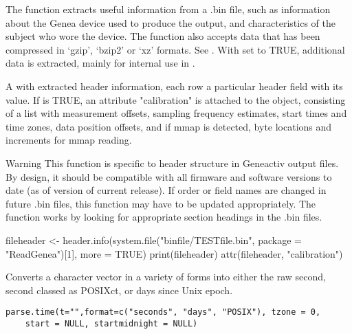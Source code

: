 \documentclass[a4paper]{book}
\begin{document}
%
\begin{Details}\relax
The function extracts useful information from a .bin file, such as information about the Genea device used to produce the output, and characteristics of the subject who wore the device. The function also accepts data that has been compressed in `gzip', `bzip2' or `xz' formats. See .
With  set to TRUE, additional data is extracted, mainly for internal use in .
\end{Details}
%
\begin{Value}
A  with extracted header information, each row a particular header field with its value. 
If  is TRUE, an attribute "calibration" is attached to the object, consisting of a list with measurement offsets, sampling frequency estimates, start times and time zones, data position offsets, and if mmap is detected, byte locations and increments for mmap reading.
\end{Value}
%
\begin{Section}{Warning}
This function is specific to header structure in Geneactiv output files. By design, it should be compatible with all firmware and software versions to date (as of version of current release). If order or field names are changed in future .bin files, this function may have to be updated appropriately.
The function works by looking for appropriate section headings in the .bin files.
\end{Section}
%
\begin{SeeAlso}\relax
{}
\end{SeeAlso}
%
\begin{Examples}
\begin{ExampleCode}

fileheader <- header.info(system.file("binfile/TESTfile.bin", package = "ReadGenea")[1], more = TRUE)
print(fileheader)
attr(fileheader, "calibration")
\end{ExampleCode}
\end{Examples}
%
\begin{Description}\relax
Converts a character vector in a variety of forms into either the raw second, second classed as POSIXct, or days since Unix epoch.
\end{Description}
%
\begin{Usage}
\begin{verbatim}
parse.time(t="",format=c("seconds", "days", "POSIX"), tzone = 0, 
	start = NULL, startmidnight = NULL)
\end{verbatim}
\end{Usage}
\end{document}
